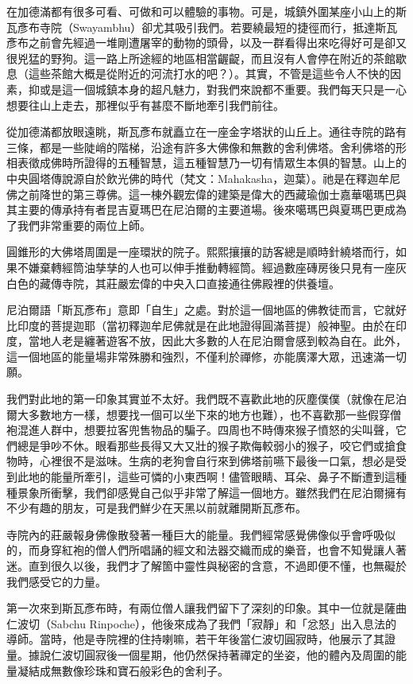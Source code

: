在加德滿都有很多可看、可做和可以體驗的事物。可是，城鎮外圍某座小山上的斯瓦彥布寺院（Swayambhu）卻尤其吸引我們。若要繞最短的捷徑而行，抵達斯瓦彥布之前會先經過一堆剛遭屠宰的動物的頭骨，以及一群看得出來吃得好可是卻又很兇猛的野狗。這一路上所途經的地區相當齷齪，而且沒有人會停在附近的茶館歇息（這些茶館大概是從附近的河流打水的吧？）。其實，不管是這些令人不快的因素，抑或是這一個城鎮本身的超凡魅力，對我們來說都不重要。我們每天只是一心想要往山上走去，那裡似乎有甚麼不斷地牽引我們前往。

從加德滿都放眼遠眺，斯瓦彥布就矗立在一座金字塔狀的山丘上。通往寺院的路有三條，都是一些陡峭的階梯，沿途有許多大佛像和無數的舍利佛塔。舍利佛塔的形相表徵成佛時所證得的五種智慧，這五種智慧乃一切有情眾生本俱的智慧。山上的中央圓塔傳說源自於飲光佛的時代（梵文：Mahakasha，迦葉）。祂是在釋迦牟尼佛之前降世的第三尊佛。這一棟外觀宏偉的建築是偉大的西藏瑜伽士嘉華噶瑪巴與其主要的傳承持有者昆吉夏瑪巴在尼泊爾的主要道場。後來噶瑪巴與夏瑪巴更成為了我們非常重要的兩位上師。

圓錐形的大佛塔周圍是一座環狀的院子。熙熙攘攘的訪客總是順時針繞塔而行，如果不嫌棄轉經筒油孳孳的人也可以伸手推動轉經筒。經過數座磚房後只見有一座灰白色的藏傳寺院，其莊嚴宏偉的中央入口直接通往佛殿裡的供養壇。

尼泊爾語「斯瓦彥布」意即「自生」之處。對於這一個地區的佛教徒而言，它就好比印度的菩提迦耶（當初釋迦牟尼佛就是在此地證得圓滿菩提）般神聖。由於在印度，當地人老是纏著遊客不放，因此大多數的人在尼泊爾會感到較為自在。此外，這一個地區的能量場非常殊勝和強烈，不僅利於禪修，亦能廣澤大眾，迅速滿一切願。

我們對此地的第一印象其實並不太好。我們既不喜歡此地的灰塵僕僕（就像在尼泊爾大多數地方一樣，想要找一個可以坐下來的地方也難），也不喜歡那一些假穿僧袍混進人群中，想要拉客兜售物品的騙子。四周也不時傳來猴子憤怒的尖叫聲，它們總是爭吵不休。眼看那些長得又大又壯的猴子欺侮較弱小的猴子，咬它們或搶食物時，心裡很不是滋味。生病的老狗會自行來到佛塔前嚥下最後一口氣，想必是受到此地的能量所牽引，這些可憐的小東西啊！儘管眼睛、耳朵、鼻子不斷遭到這種種景象所衝擊，我們卻感覺自己似乎非常了解這一個地方。雖然我們在尼泊爾擁有不少有趣的朋友，可是我們鮮少在天黑以前就離開斯瓦彥布。

寺院內的莊嚴報身佛像散發著一種巨大的能量。我們經常感覺佛像似乎會呼吸似的，而身穿紅袍的僧人們所唱誦的經文和法器交織而成的樂音，也會不知覺讓人著迷。直到很久以後，我們才了解箇中靈性與秘密的含意，不過即便不懂，也無礙於我們感受它的力量。

第一次來到斯瓦彥布時，有兩位僧人讓我們留下了深刻的印象。其中一位就是薩曲仁波切（Sabchu
Rinpoche），他後來成為了我們「寂靜」和「忿怒」出入息法的導師。當時，他是寺院裡的住持喇嘛，若干年後當仁波切圓寂時，他展示了其證量。據說仁波切圓寂後一個星期，他仍然保持著禪定的坐姿，他的體內及周圍的能量凝結成無數像珍珠和寶石般彩色的舍利子。


